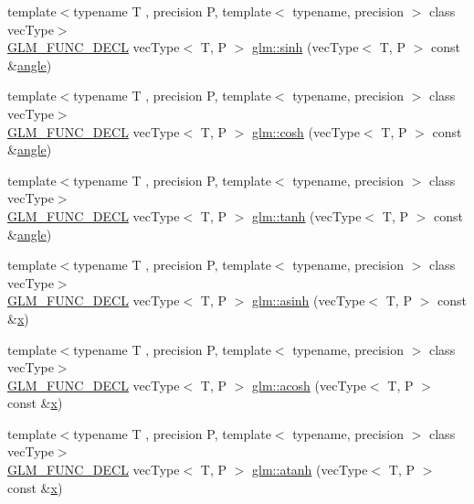 \begin{DoxyCompactItemize}
\item 
{\footnotesize template$<$typename T , precision P, template$<$ typename, precision $>$ class vec\+Type$>$ }\\\mbox{\hyperlink{setup_8hpp_ab2d052de21a70539923e9bcbf6e83a51}{G\+L\+M\+\_\+\+F\+U\+N\+C\+\_\+\+D\+E\+CL}} vec\+Type$<$ T, P $>$ \mbox{\hyperlink{group__core__func__trigonometric_gad8f89c12efe6f8d3ae8046625b266254}{glm\+::sinh}} (vec\+Type$<$ T, P $>$ const \&\mbox{\hyperlink{group__gtc__quaternion_gad4a4448baedb198b2b1e7880d2544dc9}{angle}})
\item 
{\footnotesize template$<$typename T , precision P, template$<$ typename, precision $>$ class vec\+Type$>$ }\\\mbox{\hyperlink{setup_8hpp_ab2d052de21a70539923e9bcbf6e83a51}{G\+L\+M\+\_\+\+F\+U\+N\+C\+\_\+\+D\+E\+CL}} vec\+Type$<$ T, P $>$ \mbox{\hyperlink{group__core__func__trigonometric_ga660582a4e5e843b6c1cd535777e8c295}{glm\+::cosh}} (vec\+Type$<$ T, P $>$ const \&\mbox{\hyperlink{group__gtc__quaternion_gad4a4448baedb198b2b1e7880d2544dc9}{angle}})
\item 
{\footnotesize template$<$typename T , precision P, template$<$ typename, precision $>$ class vec\+Type$>$ }\\\mbox{\hyperlink{setup_8hpp_ab2d052de21a70539923e9bcbf6e83a51}{G\+L\+M\+\_\+\+F\+U\+N\+C\+\_\+\+D\+E\+CL}} vec\+Type$<$ T, P $>$ \mbox{\hyperlink{group__core__func__trigonometric_ga234e904a0075f88654a594b5f837711f}{glm\+::tanh}} (vec\+Type$<$ T, P $>$ const \&\mbox{\hyperlink{group__gtc__quaternion_gad4a4448baedb198b2b1e7880d2544dc9}{angle}})
\item 
{\footnotesize template$<$typename T , precision P, template$<$ typename, precision $>$ class vec\+Type$>$ }\\\mbox{\hyperlink{setup_8hpp_ab2d052de21a70539923e9bcbf6e83a51}{G\+L\+M\+\_\+\+F\+U\+N\+C\+\_\+\+D\+E\+CL}} vec\+Type$<$ T, P $>$ \mbox{\hyperlink{group__core__func__trigonometric_ga72bf44c1984e1afb63acf821ba33cac7}{glm\+::asinh}} (vec\+Type$<$ T, P $>$ const \&\mbox{\hyperlink{glad_8h_a92d0386e5c19fb81ea88c9f99644ab1d}{x}})
\item 
{\footnotesize template$<$typename T , precision P, template$<$ typename, precision $>$ class vec\+Type$>$ }\\\mbox{\hyperlink{setup_8hpp_ab2d052de21a70539923e9bcbf6e83a51}{G\+L\+M\+\_\+\+F\+U\+N\+C\+\_\+\+D\+E\+CL}} vec\+Type$<$ T, P $>$ \mbox{\hyperlink{group__core__func__trigonometric_ga3f368ad3e1883b60748ca2634d816104}{glm\+::acosh}} (vec\+Type$<$ T, P $>$ const \&\mbox{\hyperlink{glad_8h_a92d0386e5c19fb81ea88c9f99644ab1d}{x}})
\item 
{\footnotesize template$<$typename T , precision P, template$<$ typename, precision $>$ class vec\+Type$>$ }\\\mbox{\hyperlink{setup_8hpp_ab2d052de21a70539923e9bcbf6e83a51}{G\+L\+M\+\_\+\+F\+U\+N\+C\+\_\+\+D\+E\+CL}} vec\+Type$<$ T, P $>$ \mbox{\hyperlink{group__core__func__trigonometric_gaffa8decdd8620759f4e6fe4834768b87}{glm\+::atanh}} (vec\+Type$<$ T, P $>$ const \&\mbox{\hyperlink{glad_8h_a92d0386e5c19fb81ea88c9f99644ab1d}{x}})
\end{DoxyCompactItemize}


